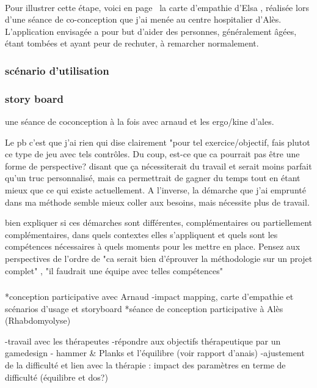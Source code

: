 \paragraph{} Pour illustrer cette étape, voici en page~\pageref{empathie_elsa} la carte d'empathie d'Elsa , réalisée lors d'une séance de co-conception que j'ai menée au centre hospitalier d'Alès. L'application envisagée a pour but d'aider des personnes, généralement âgées, étant tombées et ayant peur de rechuter, à remarcher normalement.



\label{empathie_elsa}

	
	\subsubsection*{scénario d'utilisation}
	\subsubsection*{story board}
	
	
 une séance de coconception à la fois avec arnaud et les ergo/kine d'ales.
	 
 Le pb c'est que j'ai rien qui dise clairement "pour tel exercice/objectif, fais plutot ce type de jeu avec tels contrôles. Du coup, est-ce que ca pourrait pas être une forme de perspective? disant que ça nécessiterait du travail et serait moins parfait qu'un truc personnalisé, mais ca permettrait de gagner du temps tout en étant mieux que ce qui existe actuellement. A l'inverse, la démarche que j'ai emprunté dans ma méthode semble mieux coller aux besoins, mais nécessite plus de travail.
 
 bien expliquer si ces démarches sont différentes, complémentaires ou partiellement complémentaires, dans quels contextes elles s'appliquent et quels sont les compétences nécessaires à quels moments pour les mettre en place.
 Pensez aux perspectives de l'ordre de "ca serait bien d'éprouver la méthodologie sur un projet complet" , "il faudrait une équipe avec telles compétences"
		\subsubsection{}

	*conception participative avec Arnaud 
		-impact mapping, carte d'empathie et scénarios d'usage et storyboard
	*séance de conception participative à Alès (Rhabdomyolyse)
	
	-travail avec les thérapeutes
	-répondre aux objectifs thérapeutique par un gamedesign
		- hammer \& Planks et l'équilibre (voir rapport d'anais)
	-ajustement de la difficulté et lien avec la thérapie : impact des paramètres en terme de difficulté (équilibre et dos?)
